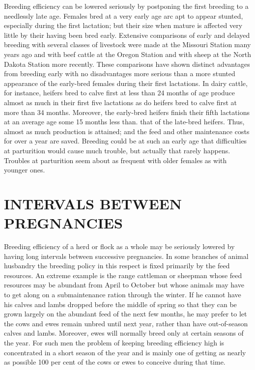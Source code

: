 Breeding efficiency can be lowered seriously by postponing the first
breeding to a needlessly late age. Females bred at a very early age arc
apt to appear stunted, especially during the first lactation; but their
size when mature is affected very little by their having been bred early.
Extensive comparisons of early and delayed breeding with several
classes of livestock were made at the Missouri Station many years ago
and with beef cattle at the Oregon Station and with sheep at the North
Dakota Station more recently. These comparisons have shown distinct
advantages from breeding early with no disadvantages more serious
than a more stunted appearance of the early-bred females during their
first lactations. In dairy cattle, for instance, heifers bred to calve first at
less than 24 months of age produce almost as much in their first five
lactations as do heifers bred to calve first at more than 34 months. Moreover,
the early-bred heifers finish their fifth lactations at an average age
some 15 months less than. that of the late-bred heifers. Thus, almost as
much production is attained; and the feed and other maintenance costs
for over a year are saved. Breeding could be at such an early age that
difficulties at parturition would cause much trouble, but actually that
rarely happens. Troubles at parturition seem about as frequent with
older females as with younger ones.

\section*{INTERVALS BETWEEN PREGNANCIES}

Breeding efficiency of a herd or flock as a whole may be seriously
lowered by having long intervals between successive pregnancies. In
some branches of animal husbandry the breeding policy in this respect
is fixed primarily by the feed resources. An extreme example is the
range cattleman or sheepman whose feed resources may be abundant
from April to October but whose animals may have to get along on a
submaintenance ration through the winter. If he cannot have his calves
and lambs dropped before the middle of spring so that they can be
grown largely on the abundant feed of the next few months, he may
prefer to let the cows and ewes remain unbred until next year, rather
than have out-of-season calves and lambs. Moreover, ewes will normally
breed only at certain seasons of the year. For such men the problem of
keeping breeding efficiency high is concentrated in a short season of
the year and is mainly one of getting as nearly as possible 100 per cent
of the cows or ewes to conceive during that time.

